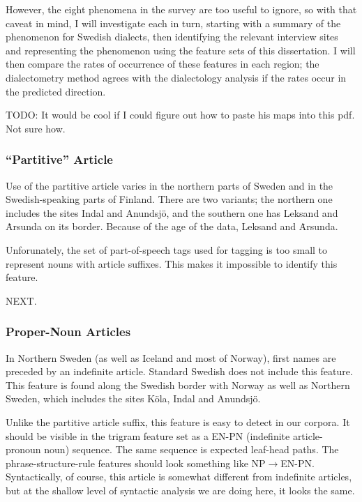 However, the eight phenomena in the survey are too useful to ignore, so
with that caveat in mind, I will investigate each in turn, starting
with a summary of the phenomenon for Swedish dialects, then
identifying the relevant interview sites and representing the
phenomenon using the feature sets of this dissertation. I will then
compare the rates of occurrence of these features in each region; the
dialectometry method agrees with the dialectology analysis if the
rates occur in the predicted direction.

TODO: It would be cool if I could figure out how to paste his maps
into this pdf. Not sure how.

\subsubsection{``Partitive'' Article}

Use of the partitive article varies in the northern parts of Sweden
and in the Swedish-speaking parts of Finland. There are two variants;
the northern one includes the sites Indal and Anundsj\"o, and the
southern one has Leksand and \.Arsunda on its border. Because of the age of
the data, Leksand and \.Arsunda.

Unforunately, the set of part-of-speech tags used for tagging is too
small to represent nouns with article suffixes. This makes it
impossible to identify this feature.

NEXT.

\subsubsection{Proper-Noun Articles}

In Northern Sweden (as well as Iceland and most of Norway), first
names are preceded by an indefinite article. Standard Swedish does not include
this feature. This feature is found along the Swedish border with
Norway as well as Northern Sweden, which includes the sites K\"ola,
Indal and Anundsj\"o.

Unlike the partitive article suffix, this feature is easy to detect in
our corpora. It should be visible in the trigram feature set as a
EN-PN (indefinite article-pronoun noun) sequence. The same sequence is
expected leaf-head paths. The phrase-structure-rule features should
look something like NP$\to$EN-PN. Syntactically, of course, this article
is somewhat different from indefinite articles, but at the shallow
level of syntactic analysis we are doing here, it looks the same.

